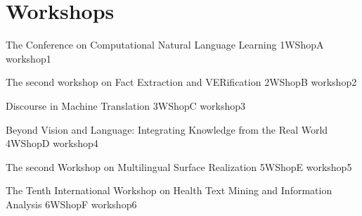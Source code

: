 \chapter[Workshops: \daydate]{Workshops}
\thispagestyle{emptyheader}
\vfill




\clearpage
{}

      \begin{wsschedule}
      {The Conference on Computational Natural Language Learning}
      {1}{WShopA}
      {workshop1}
      {\WShopLocA}
      
      \end{wsschedule}
      


\begin{wsschedule}
 {The second workshop on Fact Extraction and VERification}
 {2}{WShopB}
 {workshop2}
 {\WShopLocB}
 
\end{wsschedule}
      
\begin{wsschedule}
 {Discourse in Machine Translation}
 {3}{WShopC}
 {workshop3}
 {\WShopLocC}
 
\end{wsschedule}

\begin{wsschedule}
 {Beyond Vision and Language: Integrating Knowledge from the Real World}
 {4}{WShopD}
 {workshop4}
 {\WShopLocD}
 
\end{wsschedule}

\begin{wsschedule}
 {The second Workshop on Multilingual Surface Realization}
 {5}{WShopE}
 {workshop5}
 {\WShopLocE}
 
\end{wsschedule}

\begin{wsschedule}
 {The Tenth International Workshop on Health Text Mining and Information Analysis}
 {6}{WShopF}
 {workshop6}
 {\WShopLocF}
 
\end{wsschedule}

